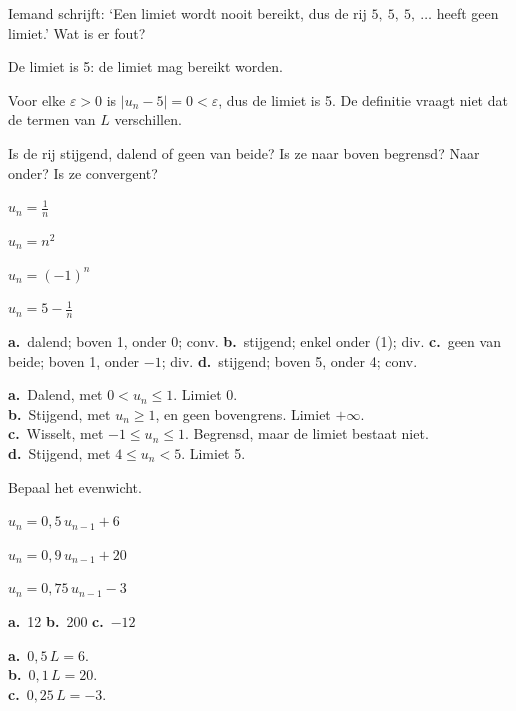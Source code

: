 \begin{oefeningen}
\begin{oefening}[1]
Iemand schrijft: `Een limiet wordt nooit bereikt, dus de rij $5,\ 5,\ 5,\ \ldots$ heeft geen limiet.' Wat is er fout?
\begin{solution}
De limiet is 5: de limiet mag bereikt worden.
\end{solution}
\begin{fullsolution}
Voor elke $\varepsilon>0$ is $|u_n-5|=0<\varepsilon$, dus de limiet is 5. De definitie vraagt niet dat de termen van $L$ verschillen.
\end{fullsolution}
\end{oefening}

\begin{oefening}[1]\label{oef:h4-monotoon}
Is de rij stijgend, dalend of geen van beide? Is ze naar boven begrensd? Naar onder? Is ze convergent?
\begin{reeks}[4]
  \item $u_n = \tfrac1n$
  \item $u_n = n^2$
  \item $u_n = (-1)^n$
  \item $u_n = 5 - \tfrac1n$
\end{reeks}
\begin{solution}
\textbf{a.}~dalend; boven 1, onder 0; conv. \quad \textbf{b.}~stijgend; enkel onder (1); div. \quad \textbf{c.}~geen van beide; boven 1, onder $-1$; div. \quad \textbf{d.}~stijgend; boven 5, onder 4; conv.
\end{solution}
\begin{fullsolution}
\textbf{a.}~Dalend, met $0<u_n\leqslant 1$. Limiet 0.\\
\textbf{b.}~Stijgend, met $u_n\geqslant 1$, en geen bovengrens. Limiet $+\infty$.\\
\textbf{c.}~Wisselt, met $-1\leqslant u_n\leqslant 1$. Begrensd, maar de limiet bestaat niet.\\
\textbf{d.}~Stijgend, met $4\leqslant u_n<5$. Limiet 5.
\end{fullsolution}
\end{oefening}

\begin{oefening}[1]\label{oef:h4-evenwicht}
Bepaal het evenwicht.
\begin{reeks}
  \item $u_n = 0{,}5\,u_{n-1} + 6$
  \item $u_n = 0{,}9\,u_{n-1} + 20$
  \item $u_n = 0{,}75\,u_{n-1} - 3$
\end{reeks}
\begin{solution}
\textbf{a.}~12 \quad \textbf{b.}~200 \quad \textbf{c.}~$-12$
\end{solution}
\begin{fullsolution}
\textbf{a.}~$0{,}5\,L=6$.\\
\textbf{b.}~$0{,}1\,L=20$.\\
\textbf{c.}~$0{,}25\,L=-3$.
\end{fullsolution}
\end{oefening}


\end{oefeningen}
